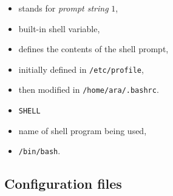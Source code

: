 \documentclass[twocolumn]{IEEEtran} %
\begin{document}
\begin{itemize}
    \bi
        \item stands for \emph{prompt string} $1$,
        \item built-in shell variable,
        \item defines the contents of the shell prompt,
        \item initially defined in \verb|/etc/profile|,
        \item then modified in \verb|/home/ara/.bashrc|.
    \ei
    \item \verb|SHELL|
    \bi
        \item name of shell program being used,
        \item \verb|/bin/bash|.
    \ei
\end{itemize}


\subsection{Configuration files}
\end{document}

